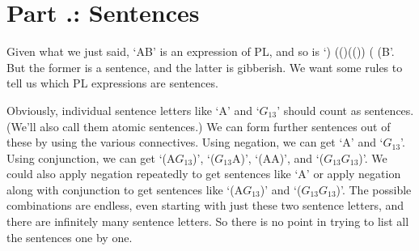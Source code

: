 \section{Part \thechapcount.\theseccount: Sentences}
Given what we just said, ‘A\eand B’ is an expression of PL, and so is ‘\enot) (\eor ()\eand (\enot\enot()) ( (B’. But the former is a sentence, and the latter is gibberish. We want some rules to tell us which PL expressions are sentences.

Obviously, individual sentence letters like ‘A’ and ‘$G_{13}$’ should count as sentences. (We’ll also call them atomic sentences.) We can form further sentences out of these by using the various connectives. Using negation, we can get ‘\enot A’ and ‘\enot $G_{13}$’. Using conjunction, we can get ‘(A\eand $G_{13}$)’, ‘($G_{13}$\eand A)’, ‘(A\eand A)’, and ‘($G_{13}$\eand $G_{13}$)’. We could also apply negation repeatedly to get sentences like ‘\enot\enot A’ or apply negation along with conjunction to get sentences like ‘\enot(A\eand $G_{13}$)’ and ‘\enot($G_{13}$\eand \enot $G_{13}$)’. The possible combinations are endless, even starting with just these two sentence letters, and there are infinitely many sentence letters. So there is no point in trying to list all the sentences one by one.

